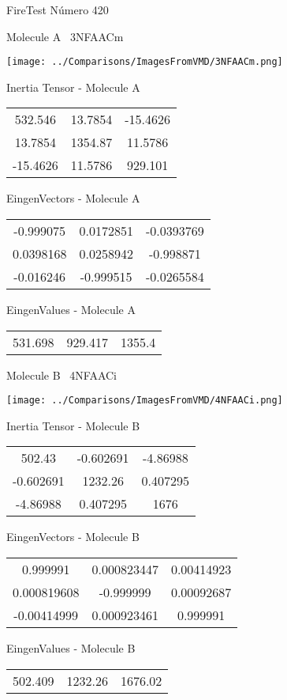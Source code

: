 \vtab[-3cm]
\begin{center}
{\large FireTest \tab Número 420}
\end{center}
\begin{multicols}{2}
\begin{center}

Molecule A \
3NFAACm

\texttt{[image: ../Comparisons/ImagesFromVMD/3NFAACm.png]}

Inertia Tensor - Molecule A \\
\begin{tabular}{|c c c|}
532.546	 & 	13.7854	 & 	-15.4626	 \\
13.7854	 & 	1354.87	 & 	11.5786	 \\
-15.4626	 & 	11.5786	 & 	929.101
\end{tabular}

\vtab
 EingenVectors - Molecule A     \\
\begin{tabular}{|c c c|}
-0.999075	 & 	0.0172851	 & 	-0.0393769	 \\
0.0398168	 & 	0.0258942	 & 	-0.998871	 \\
-0.016246	 & 	-0.999515	 & 	-0.0265584
\end{tabular}

\vtab
 EingenValues - Molecule A     \\
\begin{tabular}{|c c c|}
531.698	 & 	929.417	 & 	1355.4	 \\
\end{tabular}
\columnbreak

Molecule B \
4NFAACi

\texttt{[image: ../Comparisons/ImagesFromVMD/4NFAACi.png]}

Inertia Tensor - Molecule B \\
\begin{tabular}{|c c c|}
502.43	 & 	-0.602691	 & 	-4.86988	 \\
-0.602691	 & 	1232.26	 & 	0.407295	 \\
-4.86988	 & 	0.407295	 & 	1676
\end{tabular}

\vtab
 EingenVectors - Molecule B     \\
\begin{tabular}{|c c c|}
0.999991	 & 	0.000823447	 & 	0.00414923	 \\
0.000819608	 & 	-0.999999	 & 	0.00092687	 \\
-0.00414999	 & 	0.000923461	 & 	0.999991
\end{tabular}

\vtab
 EingenValues - Molecule B     \\
\begin{tabular}{|c c c|}
502.409	 & 	1232.26	 & 	1676.02	 \\
\end{tabular}

\end{center}
\end{multicols}

